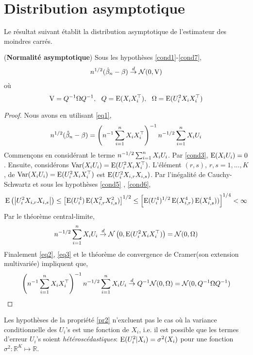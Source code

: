 \section{Distribution asymptotique}
Le résultat suivant établit la distribution asymptotique de l'estimateur des moindres carrés.
\begin{propriete}\label{pr2}(\textbf{Normalité asymptotique})
Sous les hypothèses \ref{cond1}-\ref{cond7},
\begin{align*}
n^{1/2}(\hat{\beta}_n- \beta) \overset{d}{\rightarrow} \mathcal{N}(0, \operatorname{V})
\end{align*}
où
\begin{align*}
\operatorname{V} = Q^{-1} \Omega Q^{-1}, \ \ Q = \operatorname{E}(X_iX_i^\top), \ \ \Omega =  \operatorname{E}(U_i^2X_iX_i^\top)
\end{align*}
\end{propriete}
\begin{proof}
Nous avons en utilisant \eqref{eq1},
\begin{align*}
n^{1/2}(\hat{\beta}_n- \beta) = \left(n^{-1}\sum_{i=1}^n X_iX_i^\top\right)^{-1}n^{-1/2}\sum_{i=1}^n X_iU_i 
\end{align*}
Commençons en considérant le terme $n^{-1/2}\sum_{i=1}^n X_iU_i$. Par \ref{cond3}, $\operatorname{E}(X_iU_i) = 0$. Ensuite, considérons 
$\operatorname{Var}(X_iU_i) = \operatorname{E}(U_i^2X_iX_i^\top)$.    
L'élément  $(r, s)$, $r,s = 1,...,K$, de $\operatorname{Var}(X_iU_i) = \operatorname{E}(U_i^2X_iX_i^\top)$ est $\operatorname{E}(U_i^2X_{i,r}X_{i,s})$.  
Par l'inégalité de Cauchy-Schwartz et sous les hypothèses \ref{cond5} , \ref{cond6},
\begin{align*}
\operatorname{E}\left(\left\vert {U_i^2 X_{i,r}  X_{i,s}} \right\vert\right) \leq \left[\operatorname{E}(U_i^4)\operatorname{E}(X_{i,r}^2X_{i,s}^2)\right]^{1/2} \leq  \left[\operatorname{E}(U_i^4)^{1/2}
\operatorname{E}(X_ {i,r}^4)\operatorname{E}(X_{i,s}^4))\right]^{1/4} < \infty 
\end{align*}
Par le théorème central-limite,
\begin{align}
n^{-1/2}\sum_{i=1}^n X_iU_i  \overset{d}{\rightarrow} \mathcal{N}\left(0, \operatorname{E}(U_i^2X_iX_i^\top)\right) = \mathcal{N}(0, \Omega)
\label{eq3}
\end{align}
Finalement \eqref{eq2}, \eqref{eq3} et le théorème de convergence de Cramer(son extension multivariée) impliquent que,
\begin{align*}
\left(n^{-1}\sum_{i=1}^n X_iX_i^\top\right)^{-1}n^{-1/2}\sum_{i=1}^n X_iU_i \overset{d}{\rightarrow} Q^{-1} \mathcal{N}(0, \Omega) = \mathcal{N}(0, Q^{-1}\Omega Q^{-1})
\end{align*}
\end{proof}
\begin{remarque}\label{re1}
Les hypothèses de la propriété \ref{pr2} n'excluent pas le cas où la variance conditionnelle des $U_i$'s est une fonction de $X_i$, i.e. il est possible que les termes d'erreur $U_i$'s soient \emph{hétéroscédastiques}: $\operatorname{E}(U_i^2|X_i) = \sigma^2(X_i)$ pour une fonction $\sigma^2: \mathbb{R}^K \mapsto \mathbb{R}$.
\end{remarque}
